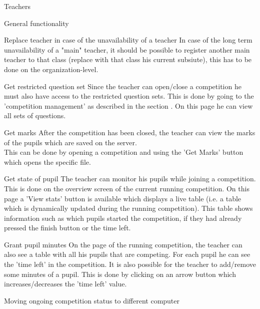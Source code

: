 \begin{section}{Teachers}
\begin{subsection}{General functionality}
\begin{subsection}{Replace teacher in case of the unavailability of a teacher}
        In case of the long term unavailability of a "main" teacher, it should be possible to register another main teacher to that class (replace with that class his current subsiute), this has to be done on the organization-level. 
        \end{subsection}
        \begin{subsubsection}{Get restricted question set}
            Since the teacher can open/close a competition he must also have access to the restricted question sets. This is done by going
            to the 'competition management' as described in the section . On this page he can view all sets of questions.
        \end{subsubsection}
        \begin{subsubsection}{Get marks}
            After the competition has been closed, the teacher can view the marks of the pupils which are saved on the server.\\
            This can be done by opening a competition and using the 'Get Marks' button which opens the specific file.
        \end{subsubsection}
        \begin{subsubsection}{Get state of pupil}
            The teacher can monitor his pupils while joining a competition. This is done on the overview screen of 		the current running competition. On this page a 'View stats' button is available which displays a live table 
            (i.e. a table which is dynamically updated during the running competition). This table shows information such as which pupils started the competition, if they had already pressed the finish button or the time left. 
        \end{subsubsection}
        \begin{subsubsection}{Grant pupil minutes}
            On the page of the running competition, the teacher can also see a table with all his pupils that are competing. For each pupil he can see the 'time left' in the competition. It is also 		possible for the teacher to add/remove some minutes of a pupil. This is done by clicking on an arrow button which increases/decreases the 'time left' value.
        \end{subsubsection}
        \begin{subsubsection}{Moving ongoing competition status to different computer}

\end{subsubsection}
\end{subsection}
\end{section}
